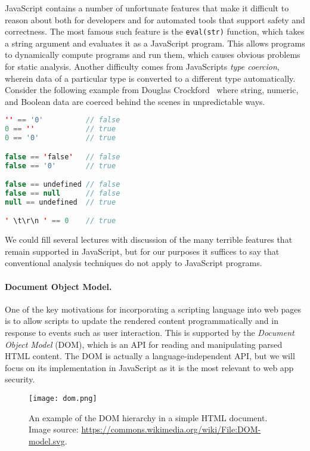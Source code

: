\documentclass[11pt,twoside]{scrartcl}
\begin{document}
JavaScript contains a number of unfortunate features that make it difficult to reason about both for developers and for automated tools that support safety and correctness. The most famous such feature is the \verb'eval(str)' function, which takes a string argument and evaluates it as a JavaScript program. This allows programs to dynamically compute programs and run them, which causes obvious problems for static analysis. Another difficulty comes from JavaScripts \emph{type coercion}, wherein data of a particular type is converted to a different type automatically. Consider the following example from Douglas Crockford~\cite{Crockford2008} where string, numeric, and Boolean data are coerced behind the scenes in unpredictable ways.
\begin{lstlisting}[language=Java]
'' == '0'          // false
0 == ''            // true
0 == '0'           // true

false == 'false'   // false
false == '0'       // true

false == undefined // false
false == null      // false
null == undefined  // true

' \t\r\n ' == 0    // true
\end{lstlisting}

We could fill several lectures with discussion of the many terrible features that remain supported in JavaScript, but for our purposes it suffices to say that conventional analysis techniques do not apply to JavaScript programs.

\paragraph{Document Object Model.}
One of the key motivations for incorporating a scripting language into web pages is to allow scripts to update the rendered content programmatically and in response to events such as user interaction. This is supported by the \emph{Document Object Model} (DOM), which is an API for reading and manipulating parsed HTML content. The DOM is actually a language-independent API, but we will focus on its implementation in JavaScript as it is the most relevant to web app security.

\begin{figure}
\centering
\texttt{[image: dom.png]}

\caption{\label{fig:dom} An example of the DOM hierarchy in a simple HTML document. Image source: \url{https://commons.wikimedia.org/wiki/File:DOM-model.svg}.}
\end{figure}
\end{document}
